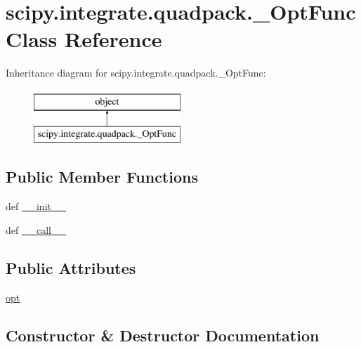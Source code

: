 \hypertarget{classscipy_1_1integrate_1_1quadpack_1_1__OptFunc}{}\section{scipy.\+integrate.\+quadpack.\+\_\+\+Opt\+Func Class Reference}
\label{classscipy_1_1integrate_1_1quadpack_1_1__OptFunc}
Inheritance diagram for scipy.\+integrate.\+quadpack.\+\_\+\+Opt\+Func\+:\begin{figure}[H]
\begin{center}
\leavevmode
\includegraphics[height=2.000000cm]{classscipy_1_1integrate_1_1quadpack_1_1__OptFunc}
\end{center}
\end{figure}
\subsection*{Public Member Functions}
\begin{DoxyCompactItemize}
\item 
def \hyperlink{classscipy_1_1integrate_1_1quadpack_1_1__OptFunc_a262a9e308972297018c9dbc19750f692}{\+\_\+\+\_\+init\+\_\+\+\_\+}
\item 
def \hyperlink{classscipy_1_1integrate_1_1quadpack_1_1__OptFunc_a2686401d10acec6040e3031568fae0b6}{\+\_\+\+\_\+call\+\_\+\+\_\+}
\end{DoxyCompactItemize}
\subsection*{Public Attributes}
\begin{DoxyCompactItemize}
\item 
\hyperlink{classscipy_1_1integrate_1_1quadpack_1_1__OptFunc_ad2e17382d0a0df87e8abd56c4c5f706b}{opt}
\end{DoxyCompactItemize}


\subsection{Constructor \& Destructor Documentation}
\hypertarget{classscipy_1_1integrate_1_1quadpack_1_1__OptFunc_a262a9e308972297018c9dbc19750f692}{}
